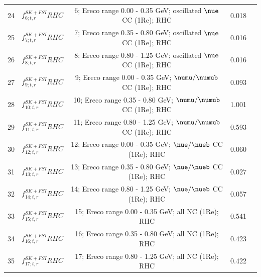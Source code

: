 {\begin{table}
\begin{tabular}{| c | c | c | c | c |}
24     &   $f_{6; t, r}^{SK+FSI}RHC$              &   6; Ereco range 0.00 - 0.35 GeV; oscillated \(\nue\)  CC (1Re); RHC          & 0.018      \\ 
25     &   $f_{7; t, r}^{SK+FSI}RHC$              &   7; Ereco range 0.35 - 0.80 GeV; oscillated \(\nue\)  CC (1Re); RHC          & 0.016      \\ 
26     &   $f_{8; t, r}^{SK+FSI}RHC$              &   8; Ereco range 0.80 - 1.25 GeV; oscillated \(\nue\)  CC (1Re); RHC          & 0.016      \\ 
27     &   $f_{9; t, r}^{SK+FSI}RHC$              &   9; Ereco range 0.00 - 0.35 GeV; \(\numu/\numub\) CC (1Re); RHC            & 0.093      \\ 
28     &   $f_{10; t, r}^{SK+FSI}RHC$             &  10; Ereco range 0.35 - 0.80 GeV; \(\numu/\numub\) CC (1Re); RHC            & 1.001      \\ 
29     &   $f_{11; t, r}^{SK+FSI}RHC$             &  11; Ereco range 0.80 - 1.25 GeV; \(\numu/\numub\) CC (1Re); RHC            & 0.593      \\ 
30     &   $f_{12; t, r}^{SK+FSI}RHC$             &  12; Ereco range 0.00 - 0.35 GeV; \(\nue/\nueb\) CC (1Re); RHC              & 0.060      \\ 
31     &   $f_{13; t, r}^{SK+FSI}RHC$             &  13; Ereco range 0.35 - 0.80 GeV; \(\nue/\nueb\) CC (1Re); RHC              & 0.027      \\ 
32     &   $f_{14; t, r}^{SK+FSI}RHC$             &  14; Ereco range 0.80 - 1.25 GeV; \(\nue/\nueb\) CC (1Re); RHC              & 0.057      \\ 
33     &   $f_{15; t, r}^{SK+FSI}RHC$             &  15; Ereco range 0.00 - 0.35 GeV; all NC (1Re); RHC                     & 0.541      \\ 
34     &   $f_{16; t, r}^{SK+FSI}RHC$             &  16; Ereco range 0.35 - 0.80 GeV; all NC (1Re); RHC                     & 0.423      \\ 
35     &   $f_{17; t, r}^{SK+FSI}RHC$             &  17; Ereco range 0.80 - 1.25 GeV; all NC (1Re); RHC                     & 0.422      \\ 


\end{tabular}
\end{table}}

